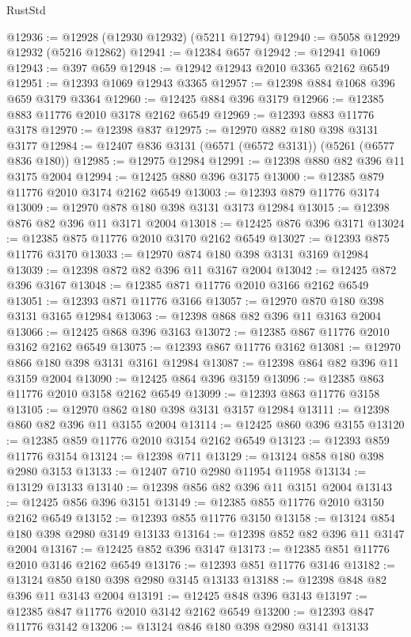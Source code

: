 \begin{lexlean}{RustStd}
\begin{coremodule}
@12936 := @12928 (@12930 @12932) (@5211 @12794)
@12940 := @5058 @12929 @12932 (@5216 @12862)
@12941 := @12384 @657
@12942 := @12941 @1069
@12943 := @397 @659
@12948 := @12942 @12943 @2010 @3365 @2162 @6549
@12951 := @12393 @1069 @12943 @3365
@12957 := @12398 @884 @1068 @396 @659 @3179 @3364
@12960 := @12425 @884 @396 @3179
@12966 := @12385 @883 @11776 @2010 @3178 @2162 @6549
@12969 := @12393 @883 @11776 @3178
@12970 := @12398 @837
@12975 := @12970 @882 @180 @398 @3131 @3177
@12984 := @12407 @836 @3131 (@6571 (@6572 @3131)) (@5261 (@6577 @836 @180))
@12985 := @12975 @12984
@12991 := @12398 @880 @82 @396 @11 @3175 @2004
@12994 := @12425 @880 @396 @3175
@13000 := @12385 @879 @11776 @2010 @3174 @2162 @6549
@13003 := @12393 @879 @11776 @3174
@13009 := @12970 @878 @180 @398 @3131 @3173 @12984
@13015 := @12398 @876 @82 @396 @11 @3171 @2004
@13018 := @12425 @876 @396 @3171
@13024 := @12385 @875 @11776 @2010 @3170 @2162 @6549
@13027 := @12393 @875 @11776 @3170
@13033 := @12970 @874 @180 @398 @3131 @3169 @12984
@13039 := @12398 @872 @82 @396 @11 @3167 @2004
@13042 := @12425 @872 @396 @3167
@13048 := @12385 @871 @11776 @2010 @3166 @2162 @6549
@13051 := @12393 @871 @11776 @3166
@13057 := @12970 @870 @180 @398 @3131 @3165 @12984
@13063 := @12398 @868 @82 @396 @11 @3163 @2004
@13066 := @12425 @868 @396 @3163
@13072 := @12385 @867 @11776 @2010 @3162 @2162 @6549
@13075 := @12393 @867 @11776 @3162
@13081 := @12970 @866 @180 @398 @3131 @3161 @12984
@13087 := @12398 @864 @82 @396 @11 @3159 @2004
@13090 := @12425 @864 @396 @3159
@13096 := @12385 @863 @11776 @2010 @3158 @2162 @6549
@13099 := @12393 @863 @11776 @3158
@13105 := @12970 @862 @180 @398 @3131 @3157 @12984
@13111 := @12398 @860 @82 @396 @11 @3155 @2004
@13114 := @12425 @860 @396 @3155
@13120 := @12385 @859 @11776 @2010 @3154 @2162 @6549
@13123 := @12393 @859 @11776 @3154
@13124 := @12398 @711
@13129 := @13124 @858 @180 @398 @2980 @3153
@13133 := @12407 @710 @2980 @11954 @11958
@13134 := @13129 @13133
@13140 := @12398 @856 @82 @396 @11 @3151 @2004
@13143 := @12425 @856 @396 @3151
@13149 := @12385 @855 @11776 @2010 @3150 @2162 @6549
@13152 := @12393 @855 @11776 @3150
@13158 := @13124 @854 @180 @398 @2980 @3149 @13133
@13164 := @12398 @852 @82 @396 @11 @3147 @2004
@13167 := @12425 @852 @396 @3147
@13173 := @12385 @851 @11776 @2010 @3146 @2162 @6549
@13176 := @12393 @851 @11776 @3146
@13182 := @13124 @850 @180 @398 @2980 @3145 @13133
@13188 := @12398 @848 @82 @396 @11 @3143 @2004
@13191 := @12425 @848 @396 @3143
@13197 := @12385 @847 @11776 @2010 @3142 @2162 @6549
@13200 := @12393 @847 @11776 @3142
@13206 := @13124 @846 @180 @398 @2980 @3141 @13133

\end{coremodule}
\end{lexlean}

